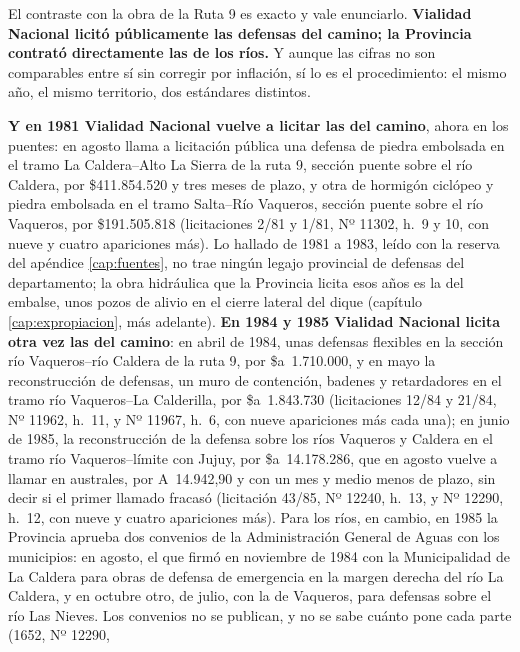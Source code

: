 El contraste con la obra de la Ruta 9 es exacto y vale enunciarlo. \textbf{Vialidad Nacional
licitó públicamente las defensas del camino; la Provincia contrató directamente las de los
ríos.} Y aunque las cifras no son comparables entre sí sin corregir por inflación, sí lo es el
procedimiento: el mismo año, el mismo territorio, dos estándares distintos.

\textbf{Y en 1981 Vialidad Nacional vuelve a licitar las del camino}, ahora en los puentes: en
agosto llama a licitación pública una defensa de piedra embolsada en el tramo La Caldera--Alto
La Sierra de la ruta 9, sección puente sobre el río Caldera, por \$411.854.520 y tres meses de
plazo, y otra de hormigón ciclópeo y piedra embolsada en el tramo Salta--Río Vaqueros, sección
puente sobre el río Vaqueros, por \$191.505.818 (licitaciones 2/81 y
1/81, Nº 11302, h.\ 9 y 10, con nueve y cuatro apariciones más). Lo hallado de 1981 a 1983,
leído con la reserva del apéndice \ref{cap:fuentes}, no trae ningún legajo provincial de
defensas del departamento; la obra hidráulica que la Provincia licita esos años es la del
embalse, unos pozos de alivio en el cierre lateral del dique (capítulo \ref{cap:expropiacion},
más adelante). \textbf{En 1984 y 1985 Vialidad Nacional licita otra vez las del camino}: en
abril de 1984, unas defensas flexibles en la sección río Vaqueros--río Caldera de la ruta 9,
por \$a~1.710.000, y en mayo la reconstrucción de defensas, un muro de contención, badenes y
retardadores en el tramo río Vaqueros--La Calderilla, por \$a~1.843.730 (licitaciones 12/84 y
21/84, Nº 11962, h.\ 11, y Nº 11967, h.\ 6, con nueve apariciones más cada una); en junio de
1985, la reconstrucción de la defensa sobre los ríos Vaqueros y Caldera en el tramo río
Vaqueros--límite con Jujuy, por \$a~14.178.286, que en agosto vuelve a llamar en australes,
por A~14.942,90 y con un mes y medio menos de plazo, sin decir si el primer llamado fracasó
(licitación 43/85, Nº 12240, h.\ 13, y Nº 12290, h.\ 12, con nueve y cuatro apariciones más).
Para los ríos, en cambio, en 1985 la Provincia aprueba dos convenios de la Administración
General de Aguas con los municipios: en agosto, el que firmó en noviembre de 1984 con la
Municipalidad de La Caldera para obras de defensa de emergencia en la margen derecha del río
La Caldera, y en octubre otro, de julio, con la de Vaqueros, para defensas sobre el río Las
Nieves. Los convenios no se publican, y no se sabe cuánto pone cada parte (1652, Nº 12290,
